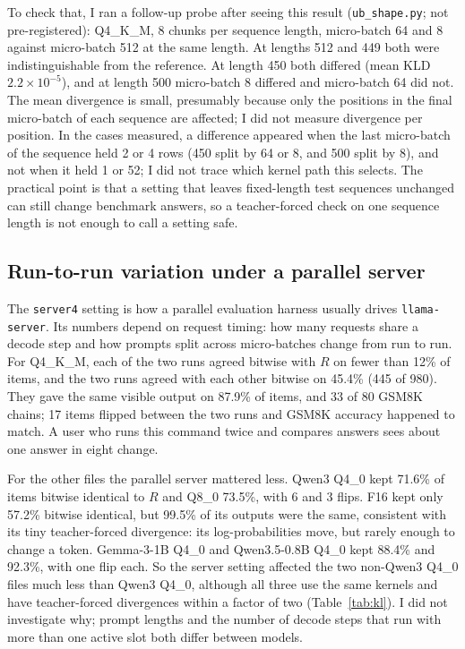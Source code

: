 To check that, I ran a follow-up probe after seeing this result (\texttt{ub\_shape.py}; not
pre-registered): Q4\_K\_M, 8 chunks per sequence length, micro-batch 64 and 8 against
micro-batch 512 at the same length. At lengths 512 and 449 both were indistinguishable from the
reference. At length 450 both differed (mean KLD $2.2\times10^{-5}$), and at length 500
micro-batch 8 differed and micro-batch 64 did not. The mean divergence is small, presumably because
only the positions in the final micro-batch of each sequence are affected; I did not measure
divergence per position. In the cases measured, a difference appeared when the last
micro-batch of the sequence held 2 or 4 rows (450 split by 64 or 8, and 500 split by 8), and not
when it held 1 or 52; I did not trace which kernel path this selects. The practical point is that
a setting that leaves fixed-length test sequences unchanged can still change benchmark answers,
so a teacher-forced check on one sequence length is not enough to call a setting safe.

\subsection{Run-to-run variation under a parallel server}
The \texttt{server4} setting is how a parallel evaluation harness usually drives
\texttt{llama-server}. Its numbers depend on request timing: how many requests share a decode
step and how prompts split across micro-batches change from run to run. For Q4\_K\_M, each of the
two runs agreed bitwise with $R$ on fewer than 12\% of items, and the two runs agreed with each
other bitwise on 45.4\% (445 of 980). They gave the same visible output on 87.9\% of items, and
33 of 80 GSM8K chains; 17 items flipped between the two runs and GSM8K accuracy happened to
match. A user who runs this command twice and compares answers sees about one answer in eight
change.

For the other files the parallel server mattered less. Qwen3 Q4\_0 kept 71.6\% of items bitwise
identical to $R$ and Q8\_0 73.5\%, with 6 and 3 flips. F16 kept only 57.2\% bitwise identical,
but 99.5\% of its outputs were the same, consistent with its tiny teacher-forced divergence:
its log-probabilities move, but rarely enough to change a token. Gemma-3-1B Q4\_0 and
Qwen3.5-0.8B Q4\_0 kept 88.4\% and 92.3\%, with one flip each. So the server setting affected
the two non-Qwen3 Q4\_0 files much less than Qwen3 Q4\_0, although all three use the same
kernels and have teacher-forced divergences within a factor of two (Table~\ref{tab:kl}). I did not investigate
why; prompt lengths and the number of decode steps that run with more than one active slot both
differ between models.

